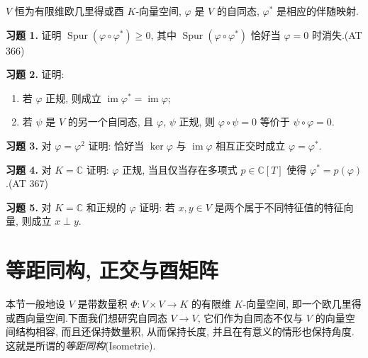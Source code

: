 \aufgaben

$V$ 恒为有限维欧几里得或酉 $K$-向量空间, $\varphi$ 是 $V$ 的自同态, $\varphi^*$ 是相应的伴随映射.

\medskip
\noindent\textbf{习题 1.} 证明 $\operatorname{Spur}(\varphi \circ \varphi^*) \geq 0$, 其中 $\operatorname{Spur}(\varphi \circ \varphi^*)$ 恰好当 $\varphi = 0$ 时消失.(AT 366)

\medskip
\noindent\textbf{习题 2.} 证明:
\begin{enumerate}
\item[(i)] 若 $\varphi$ 正规, 则成立 $\operatorname{im} \varphi^* = \operatorname{im} \varphi$;
\item[(ii)] 若 $\psi$ 是 $V$ 的另一个自同态, 且 $\varphi$, $\psi$ 正规, 则 $\varphi \circ \psi = 0$ 等价于 $\psi \circ \varphi = 0$.
\end{enumerate}

\medskip
\noindent\textbf{习题 3.} 对 $\varphi = \varphi^2$ 证明: 恰好当 $\ker \varphi$ 与 $\operatorname{im} \varphi$ 相互正交时成立 $\varphi = \varphi^*$.

\medskip
\noindent\textbf{习题 4.} 对 $K = \mathbb{C}$ 证明: $\varphi$ 正规, 当且仅当存在多项式 $p \in \mathbb{C}[T]$ 使得 $\varphi^* = p(\varphi)$.(AT 367)

\medskip
\noindent\textbf{习题 5.} 对 $K = \mathbb{C}$ 和正规的 $\varphi$ 证明: 若 $x, y \in V$ 是两个属于不同特征值的特征向量, 则成立 $x \perp y$.

\section{等距同构, 正交与酉矩阵}\label{sec:7.5}

本节一般地设 $V$ 是带数量积 $\varPhi \colon V \times V \longrightarrow K$ 的有限维 $K$-向量空间, 即一个欧几里得或酉向量空间.下面我们想研究自同态 $V \longrightarrow V$, 它们作为自同态不仅与 $V$ 的向量空间结构相容, 而且还保持数量积, 从而保持长度, 并且在有意义的情形也保持角度.这就是所谓的\emph{等距同构}(\textup{Isometrie}).

